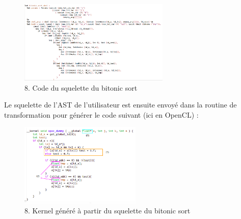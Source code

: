 \documentclass{report}
\begin{document}
\begin{figure}[!h]
\begin{center}
\includegraphics[height=150]{images_finales/skel_sort.png}
\end{center}
\caption{8. Code du squelette du bitonic sort}
\label{test}
\end{figure} \newline

Le squelette de l'AST de l'utilisateur est ensuite envoyé dans la routine de transformation pour générer le code suivant (ici en OpenCL) : 

\begin{figure}[!h]
\begin{center}
\includegraphics[height=150]{images_finales/kernel_sort.png}
\end{center}
\caption{8. Kernel généré à partir du squelette du bitonic sort}
\label{test}
\end{figure} \newline
\end{document}
